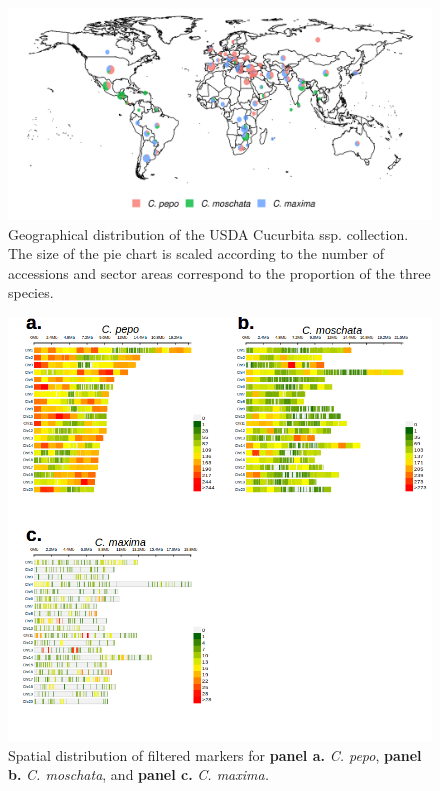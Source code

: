 \documentclass[utf8]{FrontiersinHarvard} %
\begin{document}
\begin{figure}[h]
	\begin{center}
		\includegraphics[width=\textwidth]{../../figures/01_fig.png}
	\end{center}
	\caption{Geographical distribution of the USDA Cucurbita ssp. collection. The size of the pie chart is scaled according to the number of accessions and sector areas correspond to the proportion of the three species. \label{fig:1}}
\end{figure}

\clearpage

\begin{figure}[h]
	\begin{center}
		\includegraphics[width=\textwidth]{../../supplemental/01_supfig.png}
	\end{center}
	\caption{Spatial distribution of filtered markers for \textbf{panel a.} \textit{C. pepo}, \textbf{panel b.} \textit{C. moschata}, and \textbf{panel c.} \textit{C. maxima.} \label{fig:2}}
\end{figure}
\end{document}
